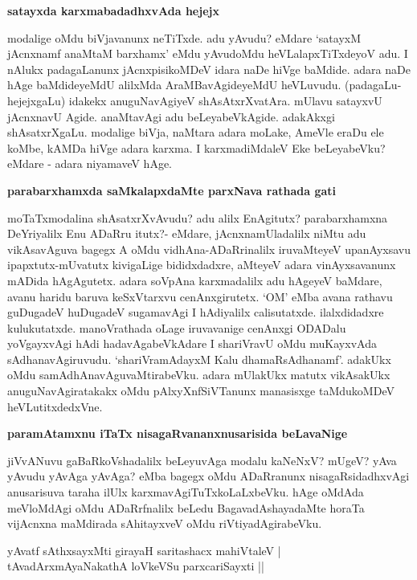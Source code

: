 {\bigskip
\noindent
{\large\bf satayxda karxmabadadhxvAda hejejx}}\label{page76}
\medskip

\noindent
modalige oMdu biVjavanunx neTiTxde. adu yAvudu? eMdare `satayxM jAcnxnamf anaMtaM barxhamx' eMdu yAvudoMdu heVLalapxTiTxdeyoV adu. I nAlukx padagaLanunx jAcnxpisikoMDeV idara naDe hiVge baMdide.\- adara naDe hAge baMdideyeMdU alilxMda AraMBavAgideyeMdU heVLuvudu. (padagaLu-hejejxgaLu) idakekx anuguNavAgiyeV shAsAtxrXvatAra. mUlavu satayxvU jAcnxnavU Agide. anaMtavAgi adu beLeya\-beVkAgide. adakAkxgi shAsatxrXgaLu. modalige biVja, naMtara adara moLake, AmeVle eraDu ele koMbe, kAMDa hiVge adara karxma. I karxmadiMdaleV Eke beLeyabeVku? eMdare - adara niyamaveV hAge.

{\bigskip
\noindent
{\large\bf parabarxhamxda saMkalapxdaMte parxNava rathada gati}}\label{page77}
\medskip

\noindent
moTaTxmodalina shAsatxrXvAvudu? adu alilx EnAgitutx? parabarxhamxna DeYriyalilx Enu ADaRru itutx?- eMdare, jAcnxnamUladalilx niMtu adu vikAsavAguva bagegx A oMdu vidhAna-ADaRrinalilx iru\-vaMteyeV upanAyxsavu ipapxtutx-mUvatutx kivigaLige bididxdadxre, aMteyeV adara vinAyxsavanunx mADida hAgAgutetx. adara soVpAna karxmadalilx adu hAgeyeV baMdare, avanu haridu baruva keSxVtarxvu cenAnxgirutetx. `OM' eMba avana rathavu guDugadeV huDugadeV sugamavAgi I hAdiyalilx calisutatxde. ilalxdidadxre kuluku\-tatxde. manoVrathada oLage iruvavanige cenAnxgi ODADalu yoVgayxvAgi hAdi hadavAgabeVkAdare I shariVravU oMdu muKayxvAda sAdhanavAgiruvudu. `shariVramAdayxM Kalu\label{77} dhamaRsAdhanamf'. adakUkx oMdu samAdhAnavAguvaMtirabeVku. adara mUlakUkx matutx vikAsakUkx anuguNavAgiratakakx oMdu pAlxyXnfSiVTanunx manasisxge taMdukoMDeV heVLutitxdedxVne.

{\bigskip
\noindent
{\large\bf paramAtamxnu iTaTx nisagaRvananxnusarisida beLavaNige}}\label{page77}
\medskip

\noindent
jiVvANuvu gaBaRkoVshadalilx beLeyuvAga modalu kaNeNxV? mUgeV? yAva yAvudu yAvAga\- yAvAga? eMba bagegx oMdu ADaRranunx nisagaRsidadhxvAgi anusarisuva taraha ilUlx karxmavAgiTuTx\-koLaLx\-beVku. hAge oMdAda meVloMdAgi oMdu ADaRrfnalilx beLedu BagavadAshayadaMte horaTa vijAcnxna maMdirada sAhitayxveV oMdu riVtiyadAgirabeVku.

\begin{shloka}
yAvatf sAthxsayxMti girayaH saritashacx mahiVtaleV |\\\label{77}
tAvadArxmAyaNakathA loVkeVSu parxcariSayxti ||
\end{shloka}

